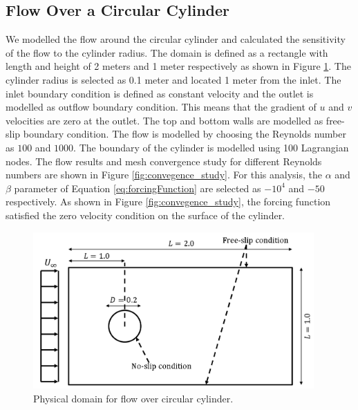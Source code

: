 \documentclass[12pt]{aiaa-pretty}
\begin{document}
\subsection{Flow Over a Circular Cylinder}
We modelled the flow around the circular cylinder and calculated the sensitivity of the flow to the cylinder radius. The domain is defined as a rectangle with length and height of 2 meters and 1 meter respectively as shown in Figure \ref{fig:cylinderDomain}. The cylinder radius is selected as 0.1 meter and located 1 meter from the inlet. The inlet boundary condition is defined as constant velocity and the outlet is modelled as outflow boundary condition. This means that the gradient of $u$ and $v$ velocities are zero at the outlet. The top and bottom walls are modelled as free-slip boundary condition. The flow is modelled by choosing the Reynolds number as $100$ and $1000$. The boundary of the cylinder is modelled using 100 Lagrangian nodes. The flow results and mesh convergence study for different Reynolds numbers are shown in Figure \ref{fig:convegence_study}. For this analysis, the $\alpha$ and $\beta$ parameter of Equation \eqref{eq:forcingFunction} are selected as $-10^4$ and $-50$ respectively. As shown in Figure \ref{fig:convegence_study}, the forcing function satisfied the zero velocity condition on the surface of the cylinder.

%
\begin{figure}[H]
	\centering
	\includegraphics[height=6.0cm]{figure/cylinder/domain.png}
	\caption{Physical domain for flow over circular cylinder.}
	\label{fig:cylinderDomain}
\end{figure}
%
\end{document}

